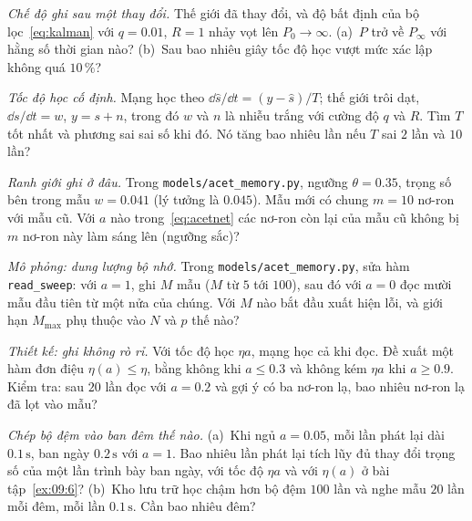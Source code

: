 \begin{exercise}[\lvlB]
\label{ex:09:2}
\emph{Chế độ ghi sau một thay đổi.} Thế giới đã thay đổi, và độ bất định của bộ lọc~\eqref{eq:kalman} với $q=0.01$, $R=1$ nhảy vọt lên $P_0\to\infty$. (a)~$P$ trở về $P_\infty$ với hằng số thời gian nào? (b)~Sau bao nhiêu giây tốc độ học vượt mức xác lập không quá $10\,\%$?
\end{exercise}

\begin{exercise}[\lvlB]
\label{ex:09:3}
\emph{Tốc độ học cố định.} Mạng học theo $\dd\hat s/\dd t=(y-\hat s)/T$; thế giới trôi dạt, $\dd s/\dd t=w$, $y=s+n$, trong đó $w$ và $n$ là nhiễu trắng với cường độ $q$ và $R$. Tìm $T$ tốt nhất và phương sai sai số khi đó. Nó tăng bao nhiêu lần nếu $T$ sai $2$ lần và $10$ lần?
\end{exercise}

\begin{exercise}[\lvlB]
\label{ex:09:4}
\emph{Ranh giới ghi ở đâu.} Trong \texttt{models/\allowbreak acet\_memory.py}, ngưỡng $\theta=0.35$, trọng số bên trong mẫu $w=0.041$ (lý tưởng là $0.045$). Mẫu mới có chung $m=10$ nơ-ron với mẫu cũ. Với $a$ nào trong~\eqref{eq:acetnet} các nơ-ron còn lại của mẫu cũ không bị $m$ nơ-ron này làm sáng lên (ngưỡng sắc)?
\end{exercise}

\begin{exercise}[\lvlB]
\label{ex:09:5}
\emph{Mô phỏng: dung lượng bộ nhớ.} Trong \texttt{models/\allowbreak acet\_memory.py}, sửa hàm \texttt{read\_sweep}: với $a=1$, ghi $M$ mẫu ($M$ từ $5$ tới $100$), sau đó với $a=0$ đọc mười mẫu đầu tiên từ một nửa của chúng. Với $M$ nào bắt đầu xuất hiện lỗi, và giới hạn $M_{\max}$ phụ thuộc vào $N$ và $p$ thế nào?
\end{exercise}

\begin{exercise}[\lvlB]
\label{ex:09:6}
\emph{Thiết kế: ghi không rò rỉ.} Với tốc độ học $\eta a$, mạng học cả khi đọc. Đề xuất một hàm đơn điệu $\eta(a)\le\eta$, bằng không khi $a\le0.3$ và không kém $\eta a$ khi $a\ge0.9$. Kiểm tra: sau $20$ lần đọc với $a=0.2$ và gợi ý có ba nơ-ron lạ, bao nhiêu nơ-ron lạ đã lọt vào mẫu?
\end{exercise}

\begin{exercise}[\lvlC]
\label{ex:09:7}
\emph{Chép bộ đệm vào ban đêm thế nào.} (a)~Khi ngủ $a=0.05$, mỗi lần phát lại dài $0.1\,\text{s}$, ban ngày $0.2\,\text{s}$ với $a=1$. Bao nhiêu lần phát lại tích lũy đủ thay đổi trọng số của một lần trình bày ban ngày, với tốc độ $\eta a$ và với $\eta(a)$ ở bài tập~\ref{ex:09:6}? (b)~Kho lưu trữ học chậm hơn bộ đệm $100$ lần và nghe mẫu $20$ lần mỗi đêm, mỗi lần $0.1\,\text{s}$. Cần bao nhiêu đêm?
\end{exercise}
